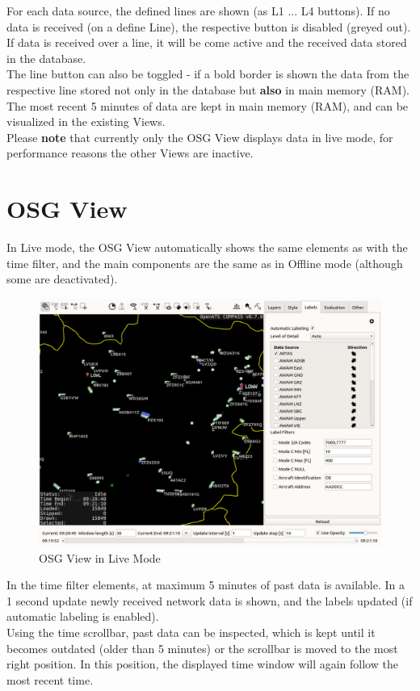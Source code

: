 For each data source, the defined lines are shown (as L1 ... L4 buttons). If no data is received (on a define Line), the respective button is disabled (greyed out). If data is received over a line, it will be come active and the received data stored in the database.  \\

The line button can also be toggled - if a bold border is shown the data from the respective line stored not only in the database but \textbf{also} in main memory (RAM). The most recent 5 minutes of data are kept in main memory (RAM), and can be visualized in the existing Views. \\

Please \textbf{note} that currently only the OSG View displays data in live mode, for performance reasons the other Views are inactive.

\section{OSG View}

In Live mode, the OSG View automatically shows the same elements as with the time filter, and the main components are the same as in Offline mode (although some are deactivated).

\begin{figure}[H]
    \hspace*{-2.5cm}
    \includegraphics[width=19cm,frame]{figures/osg_live_mode.png}
  \caption{OSG View in Live Mode}
\end{figure} 

In the time filter elements, at maximum 5 minutes of past data is available. In a 1 second update newly received network data is shown, and the labels updated (if automatic labeling is enabled). \\

Using the time scrollbar, past data can be inspected, which is kept until it becomes outdated (older than 5 minutes) or the scrollbar is moved to the most right position. In this position, the displayed time window will again follow the most recent time.

